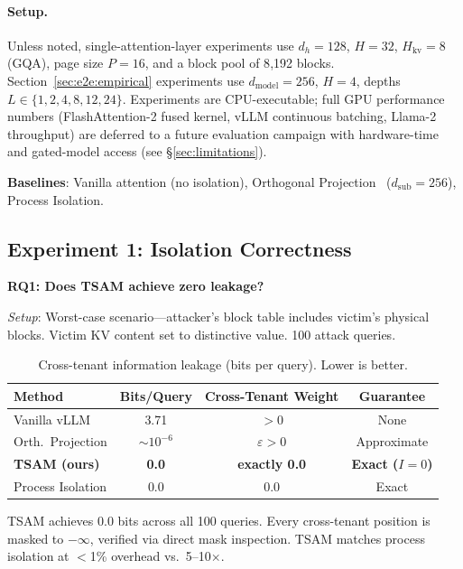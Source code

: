 \documentclass[11pt]{article}
\begin{document}
\paragraph{Setup.}  Unless noted, single-attention-layer experiments use
$d_h = 128$, $H = 32$, $H_{\mathrm{kv}} = 8$ (GQA), page size $P = 16$, and
a block pool of 8{,}192 blocks.  Section~\ref{sec:e2e:empirical}
experiments use $d_{\mathrm{model}} = 256$, $H = 4$, depths
$L \in \{1, 2, 4, 8, 12, 24\}$.  Experiments are CPU-executable; full GPU
performance numbers (FlashAttention-2 fused kernel, vLLM continuous
batching, Llama-2 throughput) are deferred to a future evaluation
campaign with hardware-time and gated-model access (see
\S\ref{sec:limitations}).

\textbf{Baselines}: Vanilla attention (no isolation), Orthogonal
Projection~\citep{li2024orthogonal} ($d_{\mathrm{sub}} = 256$), Process
Isolation.

\subsection{Experiment 1: Isolation Correctness}

\textbf{RQ1: Does TSAM achieve zero leakage?}

\emph{Setup}: Worst-case scenario---attacker's block table includes victim's physical blocks. Victim KV content set to distinctive value. 100 attack queries.

\begin{table}[t]
\centering
\caption{Cross-tenant information leakage (bits per query). Lower is better.}
\label{tab:isolation}
\begin{tabular}{@{}lccc@{}}
\toprule
\textbf{Method} & \textbf{Bits/Query} & \textbf{Cross-Tenant Weight} & \textbf{Guarantee} \\
\midrule
Vanilla vLLM & 3.71 & $> 0$ & None \\
Orth.\ Projection & $\sim 10^{-6}$ & $\varepsilon > 0$ & Approximate \\
\textbf{TSAM (ours)} & \textbf{0.0} & \textbf{exactly 0.0} & \textbf{Exact ($I{=}0$)} \\
Process Isolation & 0.0 & 0.0 & Exact \\
\bottomrule
\end{tabular}
\end{table}

TSAM achieves 0.0 bits across all 100 queries. Every cross-tenant position is masked to $-\infty$, verified via direct mask inspection. TSAM matches process isolation at $<$1\% overhead vs.\ 5--10$\times$.
\end{document}
